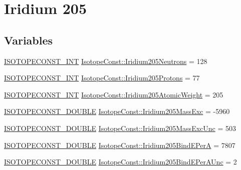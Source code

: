 \hypertarget{group___isotope_const-_iridium-_ir205}{}\section{Iridium 205}
\label{group___isotope_const-_iridium-_ir205}
\subsection*{Variables}
\begin{DoxyCompactItemize}
\item 
\mbox{\hyperlink{group___isotope_const-_macros_ga5f18360b3e99483a35c32d789e62621c}{I\+S\+O\+T\+O\+P\+E\+C\+O\+N\+S\+T\+\_\+\+I\+NT}} \mbox{\hyperlink{group___isotope_const-_iridium-_ir205_ga6d9b27a8fbcaf9d4f2429302e9d1a4ef}{Isotope\+Const\+::\+Iridium205\+Neutrons}} = 128
\item 
\mbox{\hyperlink{group___isotope_const-_macros_ga5f18360b3e99483a35c32d789e62621c}{I\+S\+O\+T\+O\+P\+E\+C\+O\+N\+S\+T\+\_\+\+I\+NT}} \mbox{\hyperlink{group___isotope_const-_iridium-_ir205_gaef97438e7a4e62b74a390ecd9a533666}{Isotope\+Const\+::\+Iridium205\+Protons}} = 77
\item 
\mbox{\hyperlink{group___isotope_const-_macros_ga5f18360b3e99483a35c32d789e62621c}{I\+S\+O\+T\+O\+P\+E\+C\+O\+N\+S\+T\+\_\+\+I\+NT}} \mbox{\hyperlink{group___isotope_const-_iridium-_ir205_ga35e3154afc3b662c048ffa5439234c55}{Isotope\+Const\+::\+Iridium205\+Atomic\+Weight}} = 205
\item 
\mbox{\hyperlink{group___isotope_const-_macros_ga8f45a7272ce02c0b4c65c44636ed719a}{I\+S\+O\+T\+O\+P\+E\+C\+O\+N\+S\+T\+\_\+\+D\+O\+U\+B\+LE}} \mbox{\hyperlink{group___isotope_const-_iridium-_ir205_gae7576e2f92b76bbfbf774093eebd6cf1}{Isotope\+Const\+::\+Iridium205\+Mass\+Exc}} = -\/5960
\item 
\mbox{\hyperlink{group___isotope_const-_macros_ga8f45a7272ce02c0b4c65c44636ed719a}{I\+S\+O\+T\+O\+P\+E\+C\+O\+N\+S\+T\+\_\+\+D\+O\+U\+B\+LE}} \mbox{\hyperlink{group___isotope_const-_iridium-_ir205_ga6b782319e20778e9d7cfc91f230e55be}{Isotope\+Const\+::\+Iridium205\+Mass\+Exc\+Unc}} = 503
\item 
\mbox{\hyperlink{group___isotope_const-_macros_ga8f45a7272ce02c0b4c65c44636ed719a}{I\+S\+O\+T\+O\+P\+E\+C\+O\+N\+S\+T\+\_\+\+D\+O\+U\+B\+LE}} \mbox{\hyperlink{group___isotope_const-_iridium-_ir205_ga17356f870c32d6555fc38e6daef40c6c}{Isotope\+Const\+::\+Iridium205\+Bind\+E\+PerA}} = 7807
\item 
\mbox{\hyperlink{group___isotope_const-_macros_ga8f45a7272ce02c0b4c65c44636ed719a}{I\+S\+O\+T\+O\+P\+E\+C\+O\+N\+S\+T\+\_\+\+D\+O\+U\+B\+LE}} \mbox{\hyperlink{group___isotope_const-_iridium-_ir205_ga22e6663dfd4152d49652b6b845b53345}{Isotope\+Const\+::\+Iridium205\+Bind\+E\+Per\+A\+Unc}} = 2

\end{DoxyCompactItemize}
